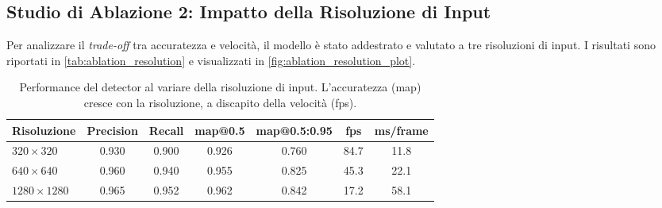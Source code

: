 \documentclass[12pt,a4paper,openright,twoside]{book}
\begin{document}
\subsection{Studio di Ablazione 2: Impatto della Risoluzione di Input}
Per analizzare il \emph{trade-off} tra accuratezza e velocità, il modello è stato addestrato e valutato a tre 
risoluzioni di input. 
I risultati sono riportati in \autoref{tab:ablation_resolution} e visualizzati in \autoref{fig:ablation_resolution_plot}.

\begin{table}[t]
  \centering
  \caption{Performance del detector al variare della risoluzione di input. L'accuratezza (\ac{map}) cresce 
  con la risoluzione, a discapito della velocità (\ac{fps}).}
  \label{tab:ablation_resolution}
  \begin{tabular}{l
                  S[table-format=1.3]
                  S[table-format=1.3]
                  S[table-format=1.3]
                  S[table-format=1.3]
                  S[table-format=2.1]
                  S[table-format=2.1]}
    \toprule
    \textbf{Risoluzione} & {\textbf{Precision}} & {\textbf{Recall}} & {\textbf{\ac{map}@0.5}} & 
    {\textbf{\ac{map}@0.5:0.95}} & {\textbf{\ac{fps}}} & {\textbf{ms/frame}}\\
    \midrule
    $320\times320$ & 0.930 & 0.900 & 0.926 & 0.760 & 84.7 & 11.8 \\
    $640\times640$ & 0.960 & 0.940 & 0.955 & 0.825 & 45.3 & 22.1 \\
    $1280\times1280$ & 0.965 & 0.952 & 0.962 & 0.842 & 17.2 & 58.1 \\
    \bottomrule
  \end{tabular}
\end{table}
\end{document}

